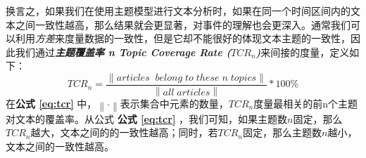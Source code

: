 换言之，如果我们在使用主题模型进行文本分析时，如果在同一个时间区间内的文本之间一致性越高，那么结果就会更显著，对事件的理解也会更深入。通常我们可以利用\emph{方差}来度量数据的一致性，但是它却不能很好的体现文本主题的一致性，因此我们通过\textbf{\emph{主题覆盖率 n Topic Coverage Rate ($TCR_n$)}}来间接的度量，定义如下：
\begin{equation}
TCR_n = \frac{\left \| articles\;\;belong\;to\;these\;n\;topics \right \|}{\left \| all\;articles \right \|} * 100\%
\end{equation}
\label{eq:tcr}
在\textbf{公式 \ref{eq:tcr}} 中，$\left \| \cdot \right \|$表示集合中元素的数量，$TCR_n$度量最相关的前n个主题对文本的覆盖率。从公式 \textbf{公式 \ref{eq:tcr}} ，我们可知，如果主题数$n$固定，那么$TCR_n$越大，文本之间的的一致性越高；同时，若$TCR_n$固定，那么主题数$n$越小，文本之间的一致性越高。
























